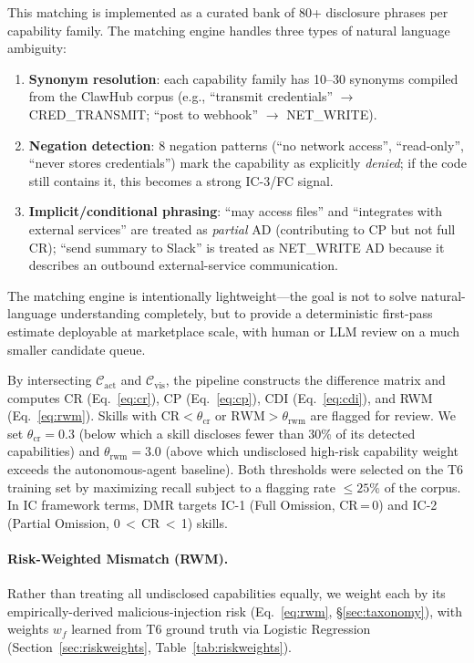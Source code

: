 \noindent
This matching is implemented as a curated bank of 80+ disclosure phrases per capability family.
The matching engine handles three types of natural language ambiguity:
\begin{enumerate}[topsep=1pt,itemsep=1pt]
\item \textbf{Synonym resolution}: each capability family has 10--30 synonyms
  compiled from the ClawHub corpus (e.g., ``transmit credentials'' $\to$
  CRED\_TRANSMIT; ``post to webhook'' $\to$ NET\_WRITE).
\item \textbf{Negation detection}: 8 negation patterns (``no network access'',
  ``read-only'', ``never stores credentials'') mark the capability as explicitly
  \emph{denied}; if the code still contains it, this becomes a strong IC-3/FC signal.
\item \textbf{Implicit/conditional phrasing}: ``may access files'' and
  ``integrates with external services'' are treated as \emph{partial} AD
  (contributing to CP but not full CR); ``send summary to Slack'' is treated
  as NET\_WRITE AD because it describes an outbound external-service communication.
\end{enumerate}
The matching engine is intentionally lightweight---the goal is not to solve
natural-language understanding completely, but to provide a deterministic
first-pass estimate deployable at marketplace scale,
with human or LLM review on a much smaller candidate queue.

By intersecting $\mathcal{C}_{\text{act}}$ and $\mathcal{C}_{\text{vis}}$, the pipeline constructs the difference matrix and computes CR (Eq.~\ref{eq:cr}), CP (Eq.~\ref{eq:cp}), CDI (Eq.~\ref{eq:cdi}), and RWM (Eq.~\ref{eq:rwm}).
Skills with $\text{CR} < \theta_{\text{cr}}$ or $\text{RWM} > \theta_{\text{rwm}}$
are flagged for review.
We set $\theta_{\text{cr}} = 0.3$ (below which a skill discloses fewer than 30\% of its detected capabilities) and $\theta_{\text{rwm}} = 3.0$ (above which undisclosed high-risk capability weight exceeds the autonomous-agent baseline).
Both thresholds were selected on the T6 training set by maximizing recall subject to a flagging rate $\leq 25\%$ of the corpus.
In IC framework terms, DMR targets IC-1 (Full Omission, CR\,=\,0) and IC-2 (Partial Omission, 0\,$<$\,CR\,$<$\,1) skills.

\paragraph{Risk-Weighted Mismatch (RWM).}
Rather than treating all undisclosed capabilities equally, we weight each
by its empirically-derived malicious-injection risk (Eq.~\ref{eq:rwm},
\S\ref{sec:taxonomy}), with weights $w_f$ learned from T6 ground truth
via Logistic Regression (Section~\ref{sec:riskweights},
Table~\ref{tab:riskweights}).

